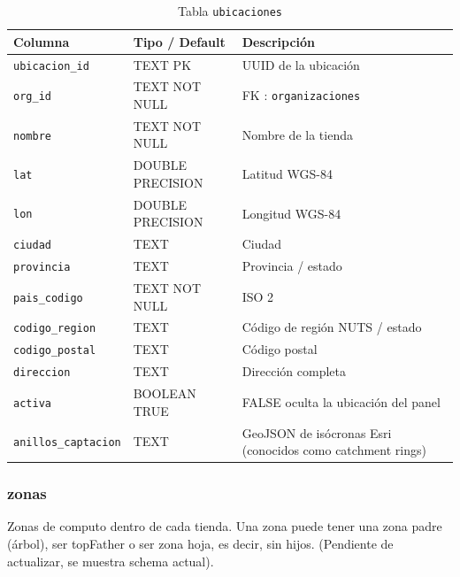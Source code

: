 \documentclass[12pt, a4paper]{article}
\begin{document}
\begin{table}[H]
\centering
\renewcommand{\arraystretch}{1.2}
\begin{tabular}{llp{5.5cm}}
\toprule
\textbf{Columna} & \textbf{Tipo / Default} & \textbf{Descripción} \\
\midrule
\texttt{ubicacion\_id}      & TEXT PK          & UUID de la ubicación \\
\texttt{org\_id}            & TEXT NOT NULL    & FK : \texttt{organizaciones} \\
\texttt{nombre}             & TEXT NOT NULL    & Nombre de la tienda \\
\texttt{lat}                & DOUBLE PRECISION & Latitud WGS-84 \\
\texttt{lon}                & DOUBLE PRECISION & Longitud WGS-84 \\
\texttt{ciudad}             & TEXT             & Ciudad \\
\texttt{provincia}          & TEXT             & Provincia / estado \\
\texttt{pais\_codigo}       & TEXT NOT NULL    & ISO 2 \\
\texttt{codigo\_region}     & TEXT             & Código de región NUTS / estado \\
\texttt{codigo\_postal}     & TEXT             & Código postal \\
\texttt{direccion}          & TEXT             & Dirección completa \\
\texttt{activa}             & BOOLEAN TRUE     & FALSE oculta la ubicación del panel \\
\texttt{anillos\_captacion} & TEXT             & GeoJSON de isócronas Esri (conocidos como catchment rings) \\
\bottomrule
\end{tabular}
\caption{Tabla \texttt{ubicaciones}}
\end{table}

\subsubsection{zonas}

Zonas de computo dentro de cada tienda. Una zona puede tener una zona padre (árbol), ser topFather o ser zona hoja, es decir, sin hijos. (Pendiente de actualizar, se muestra schema actual).
\end{document}

